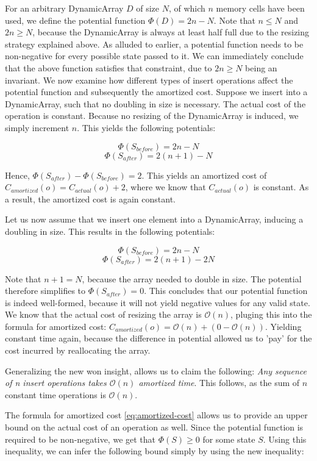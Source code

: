 For an arbitrary DynamicArray \(D\) of size \(N\), of which \(n\) memory cells have been used,  we define the potential function \(\Phi(D) = 2n - N\). Note that \(n \leq N\) and \(2n \geq N\), because the DynamicArray is always at least half full due to the resizing strategy explained above. 
As alluded to earlier, a potential function needs to be non-negative for every possible state passed to it. We can immediately conclude that the above function satisfies that constraint, due to \(2n \geq N\) being an invariant. We now examine how different types of insert operations affect the potential function and subsequently the amortized cost.
Suppose we insert into a DynamicArray, such that no doubling in size is necessary. The actual cost of the operation is constant. Because no resizing of the DynamicArray is induced, we simply increment \(n\). This yields the following potentials:

\[\Phi(S_{before}) = 2n - N\]
\[\Phi(S_{after}) = 2(n + 1) - N\]

Hence, \(\Phi(S_{after}) - \Phi(S_{before}) = 2\). This yields an amortized cost of \(C_{amortized}(o) = C_{actual}(o) + 2\), where we know that \(C_{actual}(o)\) is constant. As a result, the amortized cost is again constant.

Let us now assume that we insert one element into a DynamicArray, inducing a doubling in size. This results in the following potentials:

\[\Phi(S_{before}) = 2n - N\]
\[\Phi(S_{after}) = 2(n + 1) - 2N\]

Note that \(n + 1 = N\), because the array needed to double in size. The potential therefore simplifies to \(\Phi(S_{after}) = 0\). This concludes that our potential function is indeed well-formed, because it will not yield negative values for any valid state.
We know that the actual cost of resizing the array is \(\mathcal{O}(n)\), pluging this into the formula for amortized cost: \(C_{amortized}(o) = \mathcal{O}(n) + ( 0 - \mathcal{O}(n))\). Yielding constant time again, because the difference in potential allowed us to 'pay' for the cost incurred by reallocating the array.

Generalizing the new won insight, allows us to claim the following: \emph{Any sequence of n insert operations takes \(\mathcal{O}(n)\) amortized time}. This follows, as the sum of \(n\) constant time operations is \(\mathcal{O}(n)\). 

The formula for amortized cost \ref{eq:amortized-cost} allows us to provide an upper bound on the actual cost of an operation as well. Since the potential function is required to be non-negative, we get that \(\Phi(S) \geq 0\) for some state \(S\). Using this inequality, we can infer the following bound simply by using the new inequality:

